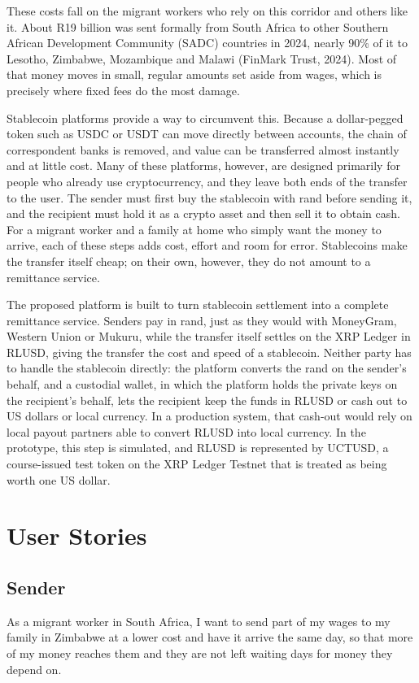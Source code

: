 \documentclass[11pt,a4paper]{article}
\begin{document}
These costs fall on the migrant workers who rely on this corridor and others like it. About R19 billion was sent formally from South Africa to other Southern African Development Community (SADC) countries in 2024, nearly 90\% of it to Lesotho, Zimbabwe, Mozambique and Malawi (FinMark Trust, 2024). Most of that money moves in small, regular amounts set aside from wages, which is precisely where fixed fees do the most damage.

Stablecoin platforms provide a way to circumvent this. Because a dollar-pegged token such as USDC or USDT can move directly between accounts, the chain of correspondent banks is removed, and value can be transferred almost instantly and at little cost. Many of these platforms, however, are designed primarily for people who already use cryptocurrency, and they leave both ends of the transfer to the user. The sender must first buy the stablecoin with rand before sending it, and the recipient must hold it as a crypto asset and then sell it to obtain cash. For a migrant worker and a family at home who simply want the money to arrive, each of these steps adds cost, effort and room for error. Stablecoins make the transfer itself cheap; on their own, however, they do not amount to a remittance service.

The proposed platform is built to turn stablecoin settlement into a complete remittance service. Senders pay in rand, just as they would with MoneyGram, Western Union or Mukuru, while the transfer itself settles on the XRP Ledger in RLUSD, giving the transfer the cost and speed of a stablecoin. Neither party has to handle the stablecoin directly: the platform converts the rand on the sender's behalf, and a custodial wallet, in which the platform holds the private keys on the recipient's behalf, lets the recipient keep the funds in RLUSD or cash out to US dollars or local currency. In a production system, that cash-out would rely on local payout partners able to convert RLUSD into local currency. In the prototype, this step is simulated, and RLUSD is represented by UCTUSD, a course-issued test token on the XRP Ledger Testnet that is treated as being worth one US dollar.

\section{User Stories}\label{sec:stories}

\subsection{Sender}
As a migrant worker in South Africa, I want to send part of my wages to my family in Zimbabwe at a lower cost and have it arrive the same day, so that more of my money reaches them and they are not left waiting days for money they depend on.
\end{document}

